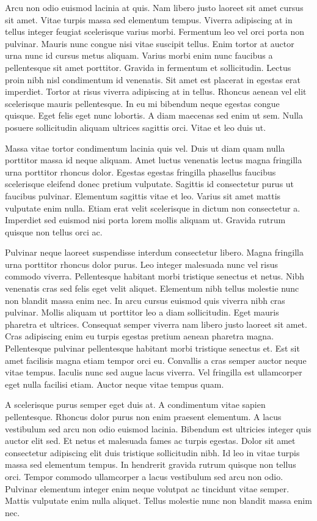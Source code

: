 \documentclass[12pt]{article}
\begin{document}
Arcu non odio euismod lacinia at quis. Nam libero justo laoreet sit amet cursus sit amet. Vitae turpis massa sed elementum tempus. Viverra adipiscing at in tellus integer feugiat scelerisque varius morbi. Fermentum leo vel orci porta non pulvinar. Mauris nunc congue nisi vitae suscipit tellus. Enim tortor at auctor urna nunc id cursus metus aliquam. Varius morbi enim nunc faucibus a pellentesque sit amet porttitor. Gravida in fermentum et sollicitudin. Lectus proin nibh nisl condimentum id venenatis. Sit amet est placerat in egestas erat imperdiet. Tortor at risus viverra adipiscing at in tellus. Rhoncus aenean vel elit scelerisque mauris pellentesque. In eu mi bibendum neque egestas congue quisque. Eget felis eget nunc lobortis. A diam maecenas sed enim ut sem. Nulla posuere sollicitudin aliquam ultrices sagittis orci. Vitae et leo duis ut.

Massa vitae tortor condimentum lacinia quis vel. Duis ut diam quam nulla porttitor massa id neque aliquam. Amet luctus venenatis lectus magna fringilla urna porttitor rhoncus dolor. Egestas egestas fringilla phasellus faucibus scelerisque eleifend donec pretium vulputate. Sagittis id consectetur purus ut faucibus pulvinar. Elementum sagittis vitae et leo. Varius sit amet mattis vulputate enim nulla. Etiam erat velit scelerisque in dictum non consectetur a. Imperdiet sed euismod nisi porta lorem mollis aliquam ut. Gravida rutrum quisque non tellus orci ac.

Pulvinar neque laoreet suspendisse interdum consectetur libero. Magna fringilla urna porttitor rhoncus dolor purus. Leo integer malesuada nunc vel risus commodo viverra. Pellentesque habitant morbi tristique senectus et netus. Nibh venenatis cras sed felis eget velit aliquet. Elementum nibh tellus molestie nunc non blandit massa enim nec. In arcu cursus euismod quis viverra nibh cras pulvinar. Mollis aliquam ut porttitor leo a diam sollicitudin. Eget mauris pharetra et ultrices. Consequat semper viverra nam libero justo laoreet sit amet. Cras adipiscing enim eu turpis egestas pretium aenean pharetra magna. Pellentesque pulvinar pellentesque habitant morbi tristique senectus et. Est sit amet facilisis magna etiam tempor orci eu. Convallis a cras semper auctor neque vitae tempus. Iaculis nunc sed augue lacus viverra. Vel fringilla est ullamcorper eget nulla facilisi etiam. Auctor neque vitae tempus quam.

A scelerisque purus semper eget duis at. A condimentum vitae sapien pellentesque. Rhoncus dolor purus non enim praesent elementum. A lacus vestibulum sed arcu non odio euismod lacinia. Bibendum est ultricies integer quis auctor elit sed. Et netus et malesuada fames ac turpis egestas. Dolor sit amet consectetur adipiscing elit duis tristique sollicitudin nibh. Id leo in vitae turpis massa sed elementum tempus. In hendrerit gravida rutrum quisque non tellus orci. Tempor commodo ullamcorper a lacus vestibulum sed arcu non odio. Pulvinar elementum integer enim neque volutpat ac tincidunt vitae semper. Mattis vulputate enim nulla aliquet. Tellus molestie nunc non blandit massa enim nec.
\end{document}
